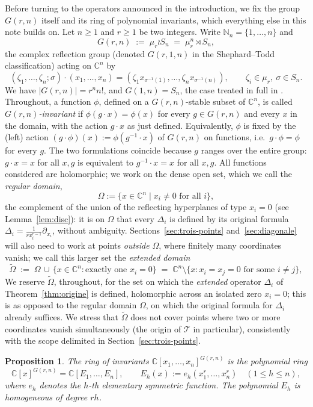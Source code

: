 \documentclass[11pt]{article}
\newtheorem{proposition}[theorem]{Proposition}
\theoremstyle{remark}
\newcommand{\NN}{\mathbb{N}}
\newcommand{\CC}{\mathbb{C}}
\begin{document}
Before turning to the operators announced in the introduction, we fix the group $G(r,n)$ itself and its ring of polynomial invariants, which everything else in this note builds on. Let $n\ge 1$ and $r\ge 1$ be two integers. Write $\NN_n=\{1,\dots,n\}$ and
\[
G(r,n) \;:=\; \mu_r \wr S_n \;=\; \mu_r^n \rtimes S_n,
\]
the complex reflection group (denoted $G(r,1,n)$ in the Shephard--Todd classification) acting on $\CC^n$ by
\[
(\zeta_1,\dots,\zeta_n;\sigma)\cdot(x_1,\dots,x_n) = (\zeta_1 x_{\sigma^{-1}(1)},\dots,\zeta_n x_{\sigma^{-1}(n)}), \qquad \zeta_i\in\mu_r,\ \sigma\in S_n.
\]
We have $|G(r,n)|=r^n n!$, and $G(1,n)=S_n$, the case treated in full in \cite{Ze}. Throughout, a function $\phi$, defined on a $G(r,n)$-stable subset of $\CC^n$, is called \emph{$G(r,n)$-invariant} if $\phi(g\cdot x)=\phi(x)$ for every $g\in G(r,n)$ and every $x$ in the domain, with the action $g\cdot x$ as just defined. Equivalently, $\phi$ is fixed by the (left) action $(g\cdot\phi)(x):=\phi(g^{-1}\cdot x)$ of $G(r,n)$ on functions, i.e.\ $g\cdot\phi=\phi$ for every $g$. The two formulations coincide because $g$ ranges over the entire group: $g\cdot x=x$ for all $x,g$ is equivalent to $g^{-1}\cdot x=x$ for all $x,g$. All functions considered are holomorphic; we work on the dense open set, which we call the \emph{regular domain},
\[
\Omega := \{x\in\CC^n \mid x_i\neq 0 \text{ for all } i\},
\]
the complement of the union of the reflecting hyperplanes of type $x_i=0$ (see Lemma~\ref{lem:disc}): it is on $\Omega$ that every $\Delta_i$ is defined by its original formula $\Delta_i=\frac{1}{rx_i^{r-1}}\partial_{x_i}$, without ambiguity. Sections~\ref{sec:trois-points} and~\ref{sec:diagonale} will also need to work at points \emph{outside} $\Omega$, where finitely many coordinates vanish; we call this larger set the \emph{extended domain}
\[
\widetilde\Omega \;:=\; \Omega\,\cup\,\{x\in\CC^n : \text{exactly one } x_i=0\} \;=\; \CC^n\setminus\{x: x_i=x_j=0 \text{ for some } i\ne j\},
\]
We reserve $\widetilde\Omega$, throughout, for the set on which the \emph{extended} operator $\Delta_i$ of Theorem~\ref{thm:origine} is defined, holomorphic across an isolated zero $x_i=0$; this is as opposed to the regular domain $\Omega$, on which the original formula for $\Delta_i$ already suffices. We stress that $\widetilde\Omega$ does not cover points where two or more coordinates vanish simultaneously (the origin of $\mathcal T$ in particular), consistently with the scope delimited in Section~\ref{sec:trois-points}.

\begin{proposition}\label{prop:invariants}
The ring of invariants $\CC[x_1,\dots,x_n]^{G(r,n)}$ is the polynomial ring
\[
\CC[x]^{G(r,n)} = \CC[E_1,\dots,E_n], \qquad E_h(x) := e_h(x_1^r,\dots,x_n^r) \quad (1\le h\le n),
\]
where $e_h$ denotes the $h$-th elementary symmetric function. The polynomial $E_h$ is homogeneous of degree $rh$.
\end{proposition}
\end{document}
